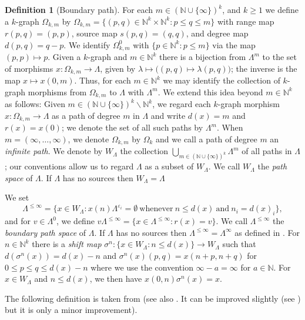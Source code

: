 \documentclass[12pt]{amsart}
\theoremstyle{plain}
\theoremstyle{definition}
\newtheorem{definition}[theorem]{Definition}
\theoremstyle{remark}
\begin{document}
\begin{definition}[Boundary path]
For each $m \in (\mathbb{N} \cup \{\infty\})^k$, and $k \ge 1$ we define a $k$-graph
$\Omega_{k,m}$ by $\Omega_{k,m} = \{(p,q) \in \mathbb{N}^k \times \mathbb{N}^k : p \le q \le m\}$ with range map
$r(p,q) = (p,p)$, source map $s(p,q) = (q,q)$, and degree map $d(p,q) = q-p$. We identify $\Omega_{k,m}^0$ with $\{p \in \mathbb{N}^k : p \le m\}$ via the map $(p,p) \mapsto p$. Given a $k$-graph
and $m \in \mathbb{N}^k$ there is a bijection from $\Lambda^m$ to the set of morphisms $x : \Omega_{k,m}
\to \Lambda$, given by $\lambda \mapsto \big((p,q)\mapsto \lambda(p,q)\big)$; the inverse is the
map $x \mapsto x(0,m)$. Thus, for each $m\in \mathbb{N}^k$ we may identify the collection of $k$-graph
morphisms from $\Omega_{k,m}$ to $\Lambda$ with $\Lambda^m$. We extend this idea beyond $m\in
\mathbb{N}^k$ as follows: Given $m \in (\mathbb{N} \cup \{\infty\})^k \backslash \mathbb{N}^k$, we regard each $k$-graph
morphism $x : \Omega_{k,m} \to \Lambda$ as a path of degree $m$ in $\Lambda$ and write $d(x)= m$ and $r(x)= x(0)$; we denote the set of all such paths by $\Lambda^m$. When $m=( \infty , \ldots , \infty )$, we denote $\Omega_{k,m}$ by $\Omega_k$ and we call a path of degree $m$ an \emph{infinite path}. We denote by
$W_\Lambda$ the collection $\bigcup_{m \in (\mathbb{N} \cup \{\infty\})^k} \Lambda^m$ of all paths in
$\Lambda$; our conventions allow us to regard $\Lambda$ as a subset of $W_\Lambda$. We call
$W_\Lambda$ the \emph{path space} of $\Lambda$.  If $\Lambda$ has no sources then $W_\Lambda=\Lambda$

We set
$$\Lambda^{\leq \infty}= \big\{ x\in W_\Lambda: x(n)\Lambda^{\varepsilon_i}=\emptyset\ \textrm{whenever}\  n\leq d(x)\ \textrm{and} \  n_i = d(x)_i\big\},
$$
and for $v\in \Lambda^0$, we define $v\Lambda^{\leq \infty}=\{x\in \Lambda^{\leq \infty}:
r(x)=v\}$. We call $\Lambda^{\leq \infty}$ the \emph{boundary path space} of $\Lambda$. If $\Lambda$ has no sources then $\Lambda^{\leq \infty}=\Lambda^\infty$ as defined in \cite[Definition 2.1]{KP2}.
For $n\in \mathbb{N}^k$ there is a \emph{shift map} $\sigma^n: \{x \in W_\Lambda :
n\leq d(x) \} \to W_\Lambda$ such that $d(\sigma^n(x))=d(x)-n$ and $\sigma^n(x)(p,q)=x(n+p,n+q)$
for $0\leq p \leq q \leq d(x)-n$ where we use the convention $\infty-a=\infty$ for $a \in \mathbb{N}$.
For $x \in W_\Lambda$ and $n\leq d(x)$, we then have $x(0,n)\sigma^n(x) = x$.
\end{definition}

\noindent
The following definition is taken from \cite[Lemma 3.2 (iv)]{RS1} (see also \cite[Appendix A]{RS1}. It can be improved slightly (see \cite[Definition 4.1]{LP}) but it is only a minor improvement).
\end{document}

